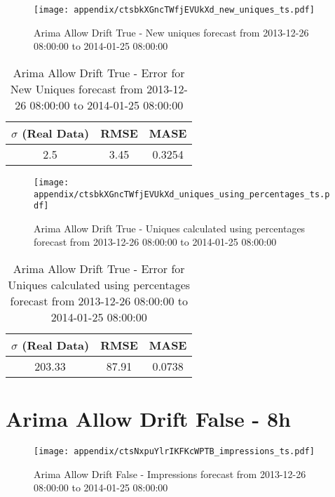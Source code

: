 \begin{figure}[H] \begin{center} \leavevmode
\texttt{[image: appendix/ctsbkXGncTWfjEVUkXd\_new\_uniques\_ts.pdf]} \caption{
Arima Allow Drift True - New uniques forecast from 2013-12-26 08:00:00 to 2014-01-25 08:00:00} \label{fig:appendix/ctsbkXGncTWfjEVUkXd_new_uniques_ts.pdf} \end{center}
\end{figure}

\begin{table}[H]
\centering
\footnotesize
\begin{tabular}{ccc}
$\sigma$ (Real Data) & RMSE & MASE   \\ \hline
2.5 & 3.45 & 0.3254 \\
\end{tabular}

\vspace{0.5cm}

\caption{
Arima Allow Drift True - Error for New Uniques forecast from 2013-12-26 08:00:00 to 2014-01-25 08:00:00}
\end{table}

\begin{figure}[H] \begin{center} \leavevmode
\texttt{[image: appendix/ctsbkXGncTWfjEVUkXd\_uniques\_using\_percentages\_ts.pdf]} \caption{
Arima Allow Drift True - Uniques calculated using percentages forecast from 2013-12-26 08:00:00 to 2014-01-25 08:00:00} \label{fig:appendix/ctsbkXGncTWfjEVUkXd_uniques_using_percentages_ts.pdf} \end{center}
\end{figure}

\begin{table}[H]
\centering
\footnotesize
\begin{tabular}{ccc}
$\sigma$ (Real Data) & RMSE & MASE   \\ \hline
203.33 & 87.91 & 0.0738 \\
\end{tabular}

\vspace{0.5cm}

\caption{
Arima Allow Drift True - Error for Uniques calculated using percentages forecast from 2013-12-26 08:00:00 to 2014-01-25 08:00:00}
\end{table}

\section{Arima Allow Drift False - 8h}
\begin{figure}[H] \begin{center} \leavevmode
\texttt{[image: appendix/ctsNxpuYlrIKFKcWPTB\_impressions\_ts.pdf]} \caption{
Arima Allow Drift False - Impressions forecast from 2013-12-26 08:00:00 to 2014-01-25 08:00:00} \label{fig:appendix/ctsNxpuYlrIKFKcWPTB_impressions_ts.pdf} \end{center}
\end{figure}

